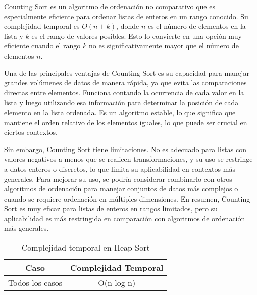 Counting Sort es un algoritmo de ordenación no comparativo que es especialmente eficiente para ordenar listas de enteros en un rango conocido. Su complejidad temporal es \(O(n + k)\), donde \(n\) es el número de elementos en la lista y \(k\) es el rango de valores posibles. Esto lo convierte en una opción muy eficiente cuando el rango \(k\) no es significativamente mayor que el número de elementos \(n\).

Una de las principales ventajas de Counting Sort es su capacidad para manejar grandes volúmenes de datos de manera rápida, ya que evita las comparaciones directas entre elementos. Funciona contando la ocurrencia de cada valor en la lista y luego utilizando esa información para determinar la posición de cada elemento en la lista ordenada. Es un algoritmo estable, lo que significa que mantiene el orden relativo de los elementos iguales, lo que puede ser crucial en ciertos contextos.

Sin embargo, Counting Sort tiene limitaciones. No es adecuado para listas con valores negativos a menos que se realicen transformaciones, y su uso se restringe a datos enteros o discretos, lo que limita su aplicabilidad en contextos más generales. Para mejorar su uso, se podría considerar combinarlo con otros algoritmos de ordenación para manejar conjuntos de datos más complejos o cuando se requiere ordenación en múltiples dimensiones. En resumen, Counting Sort es muy eficaz para listas de enteros en rangos limitados, pero su aplicabilidad es más restringida en comparación con algoritmos de ordenación más generales.

\begin{table}[h]
    \centering
    \begin{tabular}{|c|c|}
        \hline
        \textbf{Caso} & \textbf{Complejidad Temporal} \\
        \hline
        Todos los casos & O(n log n) \\
        \hline
    \end{tabular}
    \caption{Complejidad temporal en Heap Sort}
    \label{tab:complejidad_todos_casos}
\end{table}

